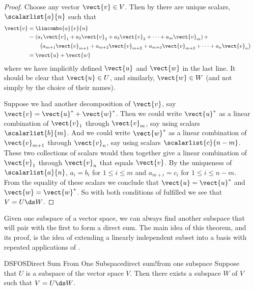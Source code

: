 \begin{proof}
Choose any vector $\vect{v}\in V$.  Then by  there are unique scalars, $\scalarlist{a}{n}$ such that 
%
\begin{align*}
\vect{v}
&=\lincombo{a}{v}{n}\\
&=\left(a_1\vect{v}_1+a_2\vect{v}_2+a_3\vect{v}_3+\dots+a_m\vect{v}_m\right)+\\
&\quad\quad\left(a_{m+1}\vect{v}_{m+1}+a_{m+2}\vect{v}_{m+2}+a_{m+3}\vect{v}_{m+3}+\dots+a_n\vect{v}_n\right)\\
&=\vect{u}+\vect{w}
\end{align*}
%
where we have implicitly defined $\vect{u}$ and $\vect{w}$ in the last line.  It should be clear that $\vect{u}\in{U}$, and similarly, $\vect{w}\in{W}$ (and not simply by the choice of their names).\par
%
Suppose we had another decomposition of $\vect{v}$, say $\vect{v}=\vect{u}^\ast+\vect{w}^\ast$.  Then we could write $\vect{u}^\ast$ as a linear combination of $\vect{v}_1$ through $\vect{v}_m$, say using scalars $\scalarlist{b}{m}$.  And we could write $\vect{w}^\ast$ as a linear combination of $\vect{v}_{m+1}$ through $\vect{v}_n$, say using scalars $\scalarlist{c}{n-m}$.  These two collections of scalars would then together give a linear combination of $\vect{v}_1$ through $\vect{v}_n$  that  equals $\vect{v}$.  By the uniqueness of $\scalarlist{a}{n}$, $a_i=b_i$ for $1\leq i\leq m$ and $a_{m+i}=c_{i}$ for $1\leq i\leq n-m$.  From the equality of these scalars we conclude that $\vect{u}=\vect{u}^\ast$ and $\vect{w}=\vect{w}^\ast$.  So with both conditions of  fulfilled we see that $V=U\ds W$.
\end{proof}
%
Given one subspace of a vector space, we can always find another subspace that will pair with the first to form a direct sum.  The main idea of this theorem, and its proof, is the idea of extending a linearly independent subset into a basis with repeated applications of .
%
\begin{theorem}{DSFOS}{Direct Sum From One Subspace}{direct sum!from one subspace}
Suppose that $U$ is a subspace of the vector space $V$.  Then there exists a subspace $W$ of $V$ such that $V=U\ds W$.
\end{theorem}
%
%

